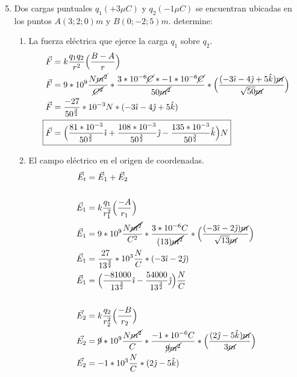 \documentclass[12pt, twoside]{article}
\begin{document}
\begin{enumerate}
	\setcounter{enumi}{4}
	\item Dos cargas puntuales $q_1(+3\mu C)$ y $q_2(-1\mu C)$
		se encuentran ubicadas en los puntos $A(3;2;0)m$ y $B(0;-2;5)m$.
		determine:
		\begin{enumerate}
			\item La fuerza eléctrica que ejerce la carga $q_1$ sobre $q_2$.
				\begin{align*}
					\vec{F} &= k \frac{q_1q_2}{r^2} \Big{(} \frac{B-A}{r} \Big{)}\\
					\vec{F} &= 9*10^9 \frac{N\cancel{m^2}}{\cancel{C^2}}*
					\frac{3*10^{-6}\cancel{C}*-1*10^{-6}\cancel{C}}{50\cancel{m^2}}*
					\Big{(} \frac{(-3\hat{\imath}-4\hat{\jmath}+5\hat{k})\cancel{m}}{\sqrt{50}\cancel{m}} \Big{)}\\
					\vec{F} &= \frac{-27}{50^ \frac{3}{2} } *10^{-3} N*
					(-3\hat{\imath}-4\hat{\jmath}+5\hat{k})\\
					\Aboxed{
						\vec{F} &= \Big{(}
						\frac{81*10^{-3}}{50^{ \frac{3}{2} }}\hat{\imath}+
						\frac{108*10^{-3}}{50^{ \frac{3}{2} }}\hat{\jmath}-
						\frac{135*10^{-3}}{50^{ \frac{3}{2} }}\hat{k}
						\Big{)}N
					}
				\end{align*}

			\item El campo eléctrico en el origen de coordenadas.
				\begin{align*}
					\vec{E}_t &= \vec{E}_1 + \vec{E}_2\\
					\\
					\vec{E}_1 &= k \frac{q_1}{r_1^2}
					\Big{(}\frac{-A}{r_1}\Big{)}\\
					\vec{E}_1 &= 9*10^{9} \frac{N\cancel{\cancel{m^2}}}{C^2}*
					\frac{3*10^{-6}C}{(13)\cancel{\cancel{m^2}}}*
					\Big{(} \frac{(-3\hat{\imath}-2\hat{\jmath})\cancel{m}}{\sqrt{13}\cancel{m}} \Big{)}\\
					\vec{E}_1 &= \frac{27}{13^{ \frac{3}{2} }}*10^3\frac{N}{C}*
					(-3\hat{\imath}-2\hat{\jmath} )\\
					\vec{E}_1 &= \Big{(} \frac{-81000}{13^{ \frac{3}{2} }}\hat{\imath}-
					\frac{54000}{13^{ \frac{3}{2} }} \hat{\jmath}
					\Big{)} \frac{N}{C}\\
					\\
					\vec{E_2} &= k \frac{q_2}{r^2_2} \Big{(} \frac{-B}{r_2} \Big{)}\\
					\vec{E_2} &= \cancel{9}*10^9 \frac{N\cancel{m^2}}{C}*
					\frac{-1*10^{-6}C}{\cancel{9}\cancel{m^2}}*
					\Big{(} \frac{(2\hat{\jmath}-5\hat{k})\cancel{m}}{3\cancel{m}} \Big{)}\\
					\vec{E_2} &= -1*10^3 \frac{N}{C}*
					(2\hat{\jmath}-5\hat{k})
				\end{align*}


\end{enumerate}
\end{enumerate}
\end{document}
